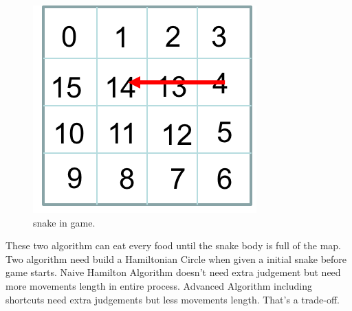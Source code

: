 \documentclass[12pt]{article}
\begin{document}
\begin{figure}[H]
\centering 
\includegraphics[scale = 0.8]{Picture3.png}
\caption{snake in game.}
\label{fig:figure4label}
\end{figure}

These two algorithm can eat every food until the snake body is full of the map. Two algorithm need build a Hamiltonian Circle when given a initial snake before game starts. Naive Hamilton Algorithm doesn't need extra judgement but need more movements length in entire process. Advanced Algorithm including shortcuts need extra judgements but less movements length. That's a trade-off.
\end{document}
